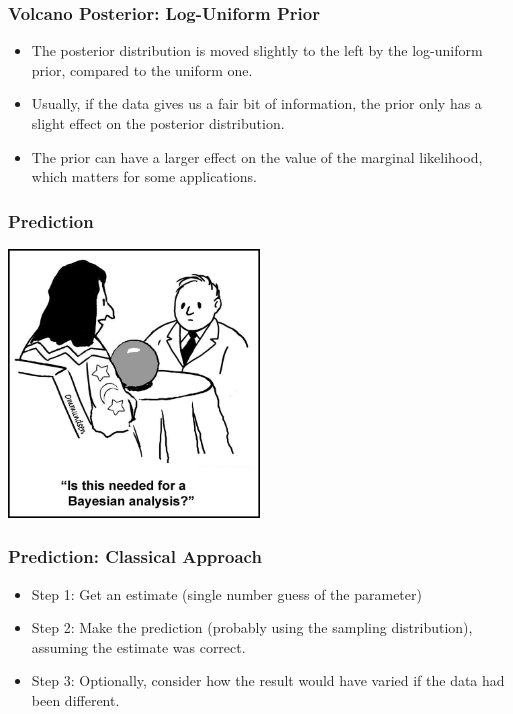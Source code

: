 \documentclass{beamer}
\begin{document}
\begin{frame}[fragile]
\frametitle{Volcano Posterior: Log-Uniform Prior}

\begin{itemize}
\item The posterior distribution is moved slightly to the left by the log-uniform prior, compared to the uniform one.\pause
\item Usually, if the data gives us a fair bit of information, the prior
only has a slight effect on the posterior distribution.\pause
\item The prior can have a larger effect on the value of the
marginal likelihood, which
matters for some applications.
\end{itemize}

\end{frame}



\begin{frame}[fragile]
\frametitle{Prediction}

\begin{center}
\includegraphics[width=0.5\textwidth]{images/crystal_ball.jpg}
\end{center}
\end{frame}


\begin{frame}
\frametitle{Prediction: Classical Approach}

\begin{itemize}
\item Step 1: Get an estimate (single number guess of the parameter)\pause
\item Step 2: Make the prediction (probably using the sampling distribution),
assuming the estimate was correct.\pause
\item Step 3: Optionally, consider how the result would have varied if the data had
been different.
\end{itemize}

\end{frame}
\end{document}
